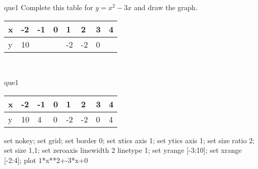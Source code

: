 \documentclass[13.5pt, varwidth=true]{beamer}
\begin{document}
\begin{frame}[shrink=19,fragile]
	\begin{beamercolorbox}[rounded=true, left, shadow=true,wd=14.8cm]{que1}
		 Complete this table for $y = x^{2} - 3x$ and draw the graph. \\[0.3cm] \renewcommand{\arraystretch}{1.2}\begin{tabular}{|C|C|C|C|C|C|C|C|} \hline x & -2 & -1 & 0 & 1 & 2 & 3 & 4 \\ \hline y & 10 &  &  & -2 & -2 & 0 & \\ \hline \end{tabular}\\[0.3cm]
	\end{beamercolorbox}
\end{frame}
\begin{frame}[shrink=19,fragile]
	\begin{beamercolorbox}[rounded=true, left, shadow=true,wd=14.8cm]{que1}
		\renewcommand{\arraystretch}{1.2}\begin{tabular}{|C|C|C|C|C|C|C|C|} \hline x & -2 & -1 & 0 & 1 & 2 & 3 & 4 \\ \hline y & 10 & 4 & 0 & -2 & -2 & 0 & 4\\ \hline \end{tabular}\begin{gnuplot}[terminal=pdf] set nokey; set grid; set border 0; set xtics axis 1; set ytics axis 1; set size ratio 2; set size 1,1; set zeroaxis linewidth 2 linetype 1; set yrange [-3:10]; set xrange [-2:4]; plot 1*x**2+-3*x+0 \end{gnuplot}
	\end{beamercolorbox}
\end{frame}
\end{document}
